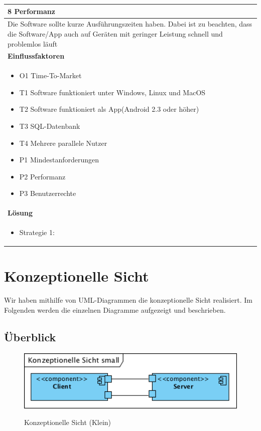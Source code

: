 \documentclass[fontsize=12pt,paper=a4,twoside]{scrartcl}
\begin{document}
\begin{table}[H]
\begin{tabular}{|p{\textwidth}|}\hline
8 Performanz\\ \hline
Die Software sollte kurze Ausführungszeiten haben. Dabei ist zu beachten, dass die Software/App auch auf Geräten mit geringer Leistung schnell und problemlos läuft\\ \hline
\textbf{Einflussfaktoren}\\
\begin{itemize}
\item O1 Time-To-Market
\item T1 Software funktioniert unter Windows, Linux und MacOS
\item T2 Software funktioniert als App(Android 2.3 oder höher)
\item T3 SQL-Datenbank
\item T4 Mehrere parallele Nutzer
\item P1 Mindestanforderungen
\item P2 Performanz
\item P3 Benutzerrechte
\end{itemize}\\ \hline
\textbf{Lösung}\\
\begin{itemize}
\item Strategie 1:  \leavevmode\newline

\end{itemize}\\ \hline
\end{tabular}
\end{table}

\newpage

\section{Konzeptionelle Sicht}
\label{sec:konzeptionell}

Wir haben mithilfe von UML-Diagrammen die konzeptionelle Sicht realisiert. Im Folgenden werden die einzelnen Diagramme aufgezeigt und beschrieben.

\subsection{Überblick}
\label{Ueberblick}

\begin{figure} [H] 
\caption{Konzeptionelle Sicht (Klein)} 
	\includegraphics[width=1\textwidth]{Diagramme/KonzeptionelleSichtKlein.png} 
	\label{pic:konzeptionellesichtklein} 
\end{figure}
\end{document}
